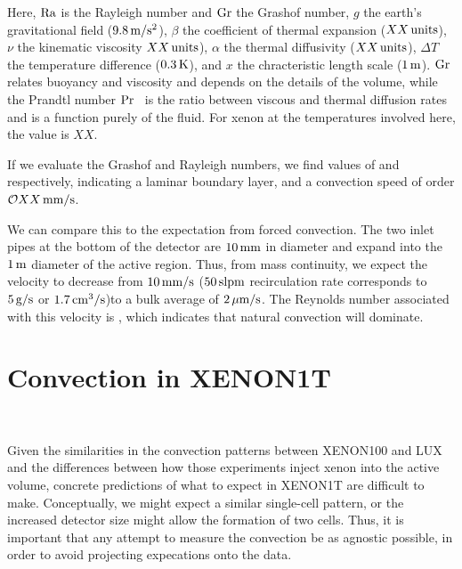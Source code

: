 Here, $\mathrm{Ra}$ is the Rayleigh number and $\mathrm{Gr}$ the Grashof number, $g$ the earth's gravitational field ($9.8\,\mathrm{m/s^2}$), $\beta$ the coefficient of thermal expansion ($XX\,\mathrm{units}$), $\nu$ the kinematic viscosity $XX\,\mathrm{units}$), $\alpha$ the thermal diffusivity ($XX\,\mathrm{units}$), $\Delta T$ the temperature difference ($0.3\,\mathrm{K}$), and $x$ the chracteristic length scale ($1\,\mathrm{m}$). $\mathrm{Gr}$ relates buoyancy and viscosity and depends on the details of the volume, while the Prandtl number $\mathrm{Pr}$~\cite{Prandtl} is the ratio between viscous and thermal diffusion rates and is a function purely of the fluid. For xenon at the temperatures involved here, the value is $XX$.

If we evaluate the Grashof and Rayleigh numbers, we find values of  and  respectively, indicating a laminar boundary layer, and a convection speed of order $\mathcal{O}{XX\,\mathrm{mm/s}}$.

We can compare this to the expectation from forced convection. The two inlet pipes at the bottom of the detector are $10\,\mathrm{mm}$ in diameter and expand into the $1\,\mathrm{m}$ diameter of the active region. Thus, from mass continuity, we expect the velocity to decrease from $10\,\mathrm{mm/s}$ ($50\,\mathrm{slpm}$ recirculation rate corresponds to $5\,\mathrm{g/s}$ or $1.7\,\mathrm{cm^3/s}$)to a bulk average of $2\,\mathrm{\mu m/s}$. The Reynolds number associated with this velocity is , which indicates that natural convection will dominate.

\section{Convection in XENON1T}~\label{sec:convection}

Given the similarities in the convection patterns between XENON100 and LUX and the differences between how those experiments inject xenon into the active volume, concrete predictions of what to expect in XENON1T are difficult to make. Conceptually, we might expect a similar single-cell pattern, or the increased detector size might allow the formation of two cells. Thus, it is important that any attempt to measure the convection be as agnostic possible, in order to avoid projecting expecations onto the data.

